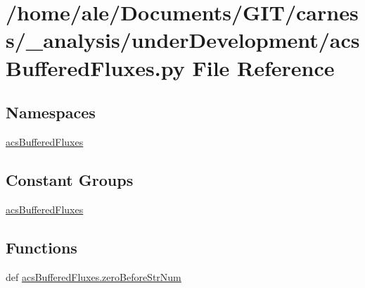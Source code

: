 \hypertarget{a00035}{\section{/home/ale/\-Documents/\-G\-I\-T/carness/\-\_\-analysis/under\-Development/acs\-Buffered\-Fluxes.py File Reference}
\label{a00035}
}
\subsection*{Namespaces}
\begin{DoxyCompactItemize}
\item 
\hyperlink{a00092}{acs\-Buffered\-Fluxes}
\end{DoxyCompactItemize}
\subsection*{Constant Groups}
\begin{DoxyCompactItemize}
\item 
\hyperlink{a00092}{acs\-Buffered\-Fluxes}
\end{DoxyCompactItemize}
\subsection*{Functions}
\begin{DoxyCompactItemize}
\item 
def \hyperlink{a00092_ad40fd27cb36a2086a2b8d0acadd4dbc9}{acs\-Buffered\-Fluxes.\-zero\-Before\-Str\-Num}
\end{DoxyCompactItemize}
